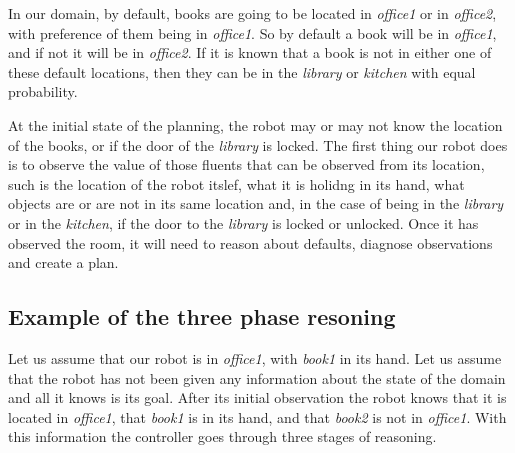 \documentclass[11pt, oneside]{article}
\begin{document}
In our domain, by default, books are going to be located in \emph{office1} or in \emph{office2}, with preference of them being in \emph{office1}. So by default a book will be in \emph{office1}, and if not it will be in \emph{office2}. If it is known that a book is not in either one of these default locations, then they can be in the \emph{library} or \emph{kitchen} with equal probability.

At the initial state of the planning, the robot may or may not know the location of the books, or if the door of the \emph{library} is locked. The first thing our robot does is to observe the value of those fluents that can be observed from its location, such is the location of the robot itslef, what it is holidng in its hand, what objects are or are not in its same location and, in the case of being in the \emph{library} or in the \emph{kitchen}, if the door to the \emph{library} is locked or unlocked. Once it has observed the room, it will need to reason about defaults, diagnose observations and create a plan.

\subsection{Example of the three phase resoning}

Let us assume that our robot is in \emph{office1}, with \emph{book1} in its hand. Let us assume that the robot has not been given any information about the state of the domain and all it knows is its goal. After its initial observation the robot knows that it is located in \emph{office1}, that \emph{book1} is in its hand, and that \emph{book2} is not in \emph{office1}. With this information the controller goes through three stages of reasoning. 
\end{document}
